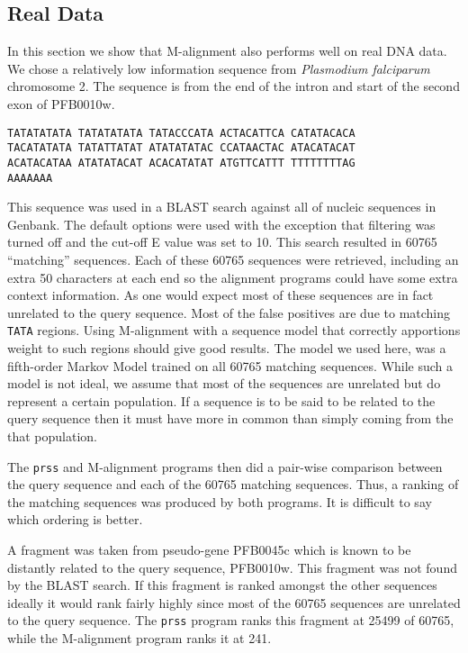 \documentclass[a4paper,11pt,oneside]{article}
\begin{document}
\subsection{Real Data}

In this section we show that M-alignment also performs well on real DNA data.
We chose a relatively low information sequence from \emph{Plasmodium
falciparum} chromosome 2.  The sequence is from the end of the intron and
start of the second exon of PFB0010w.

\begin{verbatim}
TATATATATA TATATATATA TATACCCATA ACTACATTCA CATATACACA
TACATATATA TATATTATAT ATATATATAC CCATAACTAC ATACATACAT
ACATACATAA ATATATACAT ACACATATAT ATGTTCATTT TTTTTTTTAG
AAAAAAA
\end{verbatim}

This sequence was used in a BLAST search against all of nucleic sequences in
Genbank.  The default options were used with the exception that filtering was
turned off and the cut-off E value was set to 10.  This search resulted in
60765 ``matching'' sequences.  Each of these 60765 sequences were retrieved,
including an extra 50 characters at each end so the alignment programs could
have some extra context information.  As one would expect most of these
sequences are in fact unrelated to the query sequence.  Most of the false
positives are due to matching \verb!TATA! regions.  Using M-alignment with a
sequence model that correctly apportions weight to such regions should give
good results.  The model we used here, was a fifth-order Markov Model trained
on all 60765 matching sequences.  While such a model is not ideal, we assume
that most of the sequences are unrelated but do represent a certain
population.  If a sequence is to be said to be related to the query sequence
then it must have more in common than simply coming from the that population.

The \verb!prss! and M-alignment programs then did a pair-wise comparison
between the query sequence and each of the 60765 matching sequences.  Thus, a
ranking of the matching sequences was produced by both programs.  
It is difficult to say which ordering is better.

A fragment was taken from pseudo-gene PFB0045c which is known to be distantly
related to the query sequence, PFB0010w.  This fragment was not found by the
BLAST search.  If this fragment is ranked amongst the other sequences ideally
it would rank fairly highly since most of the 60765 sequences are unrelated to
the query sequence.  The \verb!prss! program ranks this fragment at 25499 of
60765, while the M-alignment program ranks it at 241.  
\end{document}
